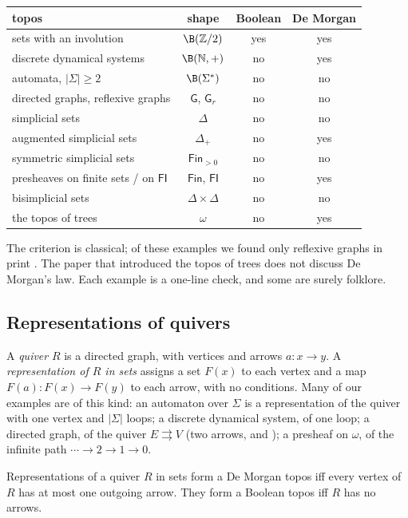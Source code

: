 \begin{center}\small
\begin{tabular}{lccc}
\toprule
topos & shape & Boolean & De Morgan\\
\midrule
sets with an involution & $\B(\mathbb Z/2)$ & yes & yes\\
discrete dynamical systems & $\B(\mathbb N,+)$ & no & yes\\
automata, $|\Sigma|\ge 2$ & $\B(\Sigma^*)$ & no & no\\
directed graphs, reflexive graphs & $\mathsf G$, $\mathsf G_r$ & no & no\\
simplicial sets & $\Delta$ & no & no\\
augmented simplicial sets & $\Delta_+$ & no & yes\\
symmetric simplicial sets & $\mathsf{Fin}_{>0}$ & no & no\\
presheaves on finite sets / on $\mathsf{FI}$ & $\mathsf{Fin}$, $\mathsf{FI}$ & no & yes\\
bisimplicial sets & $\Delta\times\Delta$ & no & no\\
the topos of trees & $\omega$ & no & yes\\
\bottomrule
\end{tabular}
\end{center}

\status{} The criterion is classical; of these examples we found only reflexive graphs in print \cite[Ex.~2.52]{hemelaer-rogers}. The paper that introduced the topos of trees \cite{birkedal} does not discuss De Morgan's law. Each example is a one-line check, and some are surely folklore.

\subsection{Representations of quivers}

A \emph{quiver} $R$ is a directed graph, with vertices and arrows $a : x\to y$. A \emph{representation of $R$ in sets} assigns a set $F(x)$ to each vertex and a map $F(a) : F(x)\to F(y)$ to each arrow, with no conditions. Many of our examples are of this kind: an automaton over $\Sigma$ is a representation of the quiver with one vertex and $|\Sigma|$ loops; a discrete dynamical system, of one loop; a directed graph, of the quiver $E\rightrightarrows V$ (two arrows,  and ); a presheaf on $\omega$, of the infinite path $\cdots\to 2\to 1\to 0$.

\begin{theorem}\label{th:quivers}
Representations of a quiver $R$ in sets form a De Morgan topos iff every vertex of $R$ has at most one outgoing arrow. They form a Boolean topos iff $R$ has no arrows.
\end{theorem}

